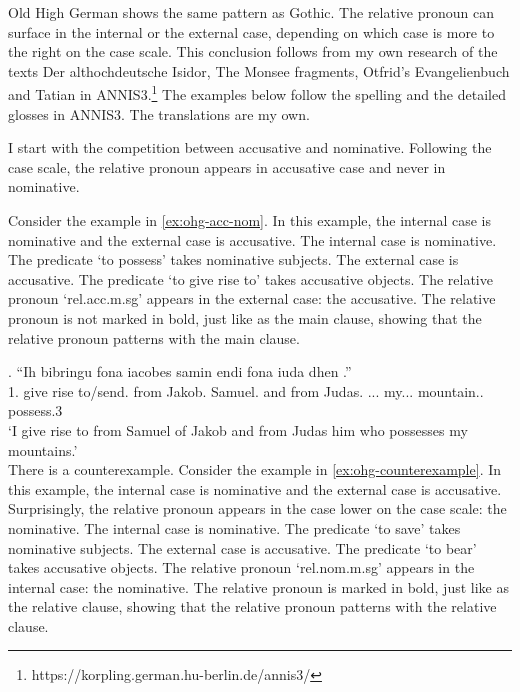 
Old High German shows the same pattern as Gothic. The relative pronoun can surface in the internal or the external case, depending on which case is more to the right on the case scale. This conclusion follows from my own research of the texts Der althochdeutsche Isidor, The Monsee fragments, Otfrid's Evangelienbuch and Tatian in ANNIS3.\footnote{
https://korpling.german.hu-berlin.de/annis3/
} The examples below follow the spelling and the detailed glosses in ANNIS3. The translations are my own.

I start with the competition between accusative and nominative. Following the case scale, the relative pronoun appears in accusative case and never in nominative.

Consider the example in \ref{ex:ohg-acc-nom}. In this example, the internal case is nominative and the external case is accusative.
The internal case is nominative. The predicate  `to possess' takes nominative subjects.
The external case is accusative. The predicate  `to give rise to' takes accusative objects.
The relative pronoun  `\ac{rel}.\ac{acc}.\ac{m}.\ac{sg}' appears in the external case: the accusative. The relative pronoun is not marked in bold, just like as the main clause, showing that the relative pronoun patterns with the main clause.


\exg. ``Ih bibringu fona iacobes samin endi fona iuda dhen   .''\\
1. {give rise to/send}.\scsub{[acc]} from Jakob. Samuel. and from Judas. ... my... mountain.. possess.3\scsub{[nom]}\\
`I give rise to from Samuel of Jakob and from Judas him who possesses my mountains.' \label{ex:ohg-acc-nom}\\

There is a counterexample.
Consider the example in \ref{ex:ohg-counterexample}. In this example, the internal case is nominative and the external case is accusative. Surprisingly, the relative pronoun appears in the case lower on the case scale: the nominative.
The internal case is nominative. The predicate  `to save' takes nominative subjects.
The external case is accusative. The predicate  `to bear' takes accusative objects.
The relative pronoun  `\ac{rel}.\ac{nom}.\ac{m}.\ac{sg}' appears in the internal case: the nominative. The relative pronoun is marked in bold, just like as the relative clause, showing that the relative pronoun patterns with the relative clause.

